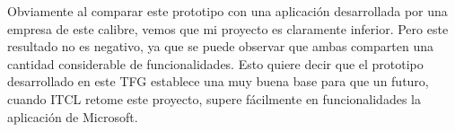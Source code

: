 Obviamente al comparar este prototipo con una aplicación desarrollada por una empresa de este calibre, vemos que mi proyecto es claramente inferior. Pero este resultado no es negativo, ya que se puede observar que ambas comparten una cantidad considerable de funcionalidades. Esto quiere decir que el prototipo desarrollado en este TFG establece una muy buena base para que un futuro, cuando ITCL retome este proyecto, supere fácilmente en funcionalidades la aplicación de Microsoft.

